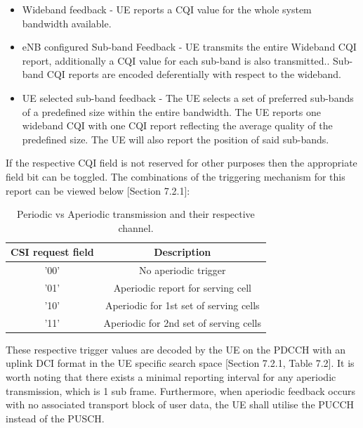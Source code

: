 \documentclass{article}
\begin{document}
\begin{itemize}
    \item Wideband feedback - UE reports a CQI value for the whole system bandwidth available.
    \item eNB configured Sub-band Feedback - UE transmits the entire Wideband CQI report, additionally a CQI value for each sub-band is also transmitted.. Sub-band CQI reports are encoded deferentially with respect to the wideband.
    \item UE selected sub-band feedback - The UE selects a set of preferred sub-bands of a predefined size within the entire bandwidth.  The UE reports one wideband CQI with one CQI report reflecting the average quality of the predefined size. The UE will also report the position of said sub-bands.
    
\end{itemize}

If the respective CQI field is not reserved for other purposes then the appropriate field bit can be toggled. The combinations of the triggering mechanism for this report can be viewed below \cite{ETSITS136213}[Section 7.2.1]: 

\begin{table}[H]
    \centering
     \begin{tabular}{||c c||} 
     \hline
      CSI request field & Description \\ [0.1ex] 
     \hline\hline
     '00' & No aperiodic trigger  \\ 
     \hline
     '01'  & Aperiodic report for serving cell\\
     \hline
     '10' & Aperiodic for 1st set of serving cells\\ 
     \hline
     '11'  & Aperiodic for 2nd set of serving cells\\
     \hline
    \end{tabular}
    \caption{Periodic vs Aperiodic transmission and their respective channel.}
    \label{tab:cqi_aperiod}
\end{table}
These respective trigger values are decoded by the UE on the PDCCH with an uplink DCI format in the UE specific search space \cite{ETSITS136213}[Section 7.2.1, Table 7.2].
It is worth noting that there exists a minimal reporting interval for any aperiodic transmission, which is 1 sub frame. Furthermore, when aperiodic feedback occurs with no associated transport block of user data, the UE shall utilise the PUCCH instead of the PUSCH.
\end{document}
